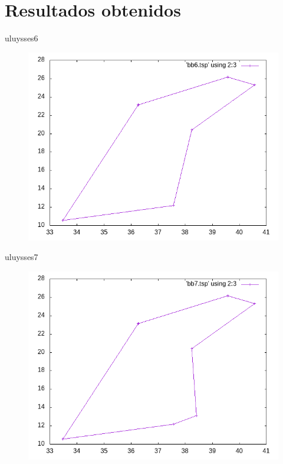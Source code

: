 \documentclass{beamer}
\begin{document}
\section{Resultados obtenidos}

\begin{frame}[fragile]{uluysses6}
\begin{figure}[H]
\centering
\includegraphics[scale=0.5]{bb6.png}
\end{figure}
\end{frame}

\begin{frame}[fragile]{uluysses7}
\begin{figure}[H]
\centering
\includegraphics[scale=0.5]{bb7.png}
\end{figure}
\end{frame}
\end{document}
